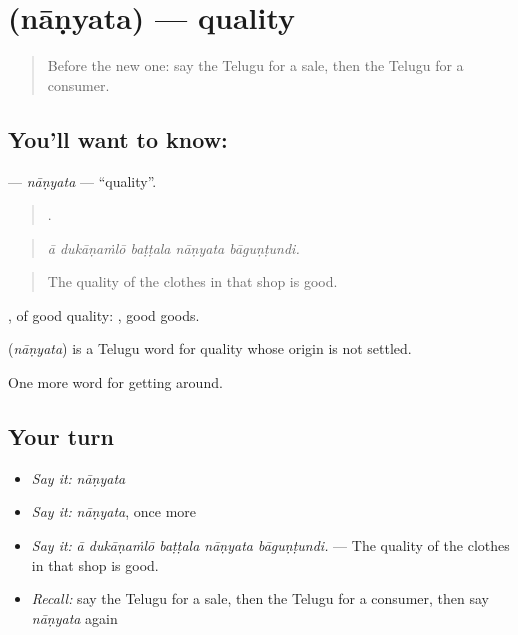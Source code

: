 \section[\texorpdfstring{\te{నాణ్యత} (nāṇyata)}{నాణ్యత (nāṇyata)}]{ (nāṇyata) — quality}

\label{lesson:TE-C484-nanyata}



\begin{quote}
Before the new one: say the Telugu for a sale, then the Telugu for a consumer.
\end{quote}

\subsection*{You'll want to know: }
\textbf{} — \emph{nāṇyata} — \textquotedblleft{}quality\textquotedblright{}.

\begin{quote}
    .
\end{quote}

\begin{quote}
\emph{ā dukāṇaṁlō baṭṭala nāṇyata bāguṇṭundi.}
\end{quote}

\begin{quote}
The quality of the clothes in that shop is good.
\end{quote}

, of good quality:  , good goods.

\begin{cousinweb}
\textbf{} (\emph{nāṇyata}) is a Telugu word for quality whose origin is not settled.
\end{cousinweb}

\begin{grammarlens}[title={What you've built}]
One more word for getting around.
\end{grammarlens}

\subsection*{Your turn}
\begin{itemize}
\raggedright
  \item \emph{Say it:} \emph{nāṇyata}
  \item \emph{Say it:} \emph{nāṇyata}, once more
  \item \emph{Say it:} \emph{ā dukāṇaṁlō baṭṭala nāṇyata bāguṇṭundi.} — The quality of the clothes in that shop is good.
  \item \emph{Recall:} say the Telugu for a sale, then the Telugu for a consumer, then say \emph{nāṇyata} again
\end{itemize}

